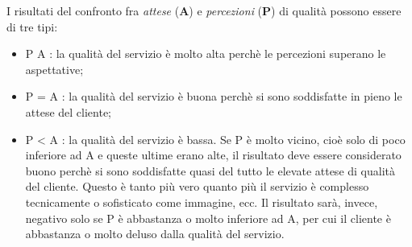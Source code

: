 I risultati del confronto fra \emph{attese} (\textbf{A}) e \emph{percezioni}
(\textbf{P}) di qualità possono essere di tre tipi:
\begin{itemize}
  \item P  A : la qualità del servizio è molto alta perchè le
  percezioni superano le aspettative;
  \item P = A : la qualità del servizio è buona perchè si sono soddisfatte
  in pieno le attese del cliente;
  \item P < A : la qualità del servizio è bassa. Se P è
  molto vicino, cioè solo di poco inferiore ad A e queste ultime erano
  alte, il risultato deve essere considerato buono perchè si sono soddisfatte
  quasi del tutto le elevate attese di qualità del cliente. Questo è tanto
  più vero quanto più il servizio è complesso tecnicamente o sofisticato come
  immagine, ecc. Il risultato sarà, invece, negativo solo se P è abbastanza o
  molto inferiore ad A, per cui il cliente è abbastanza o molto deluso dalla
  qualità del servizio.
\end{itemize}




